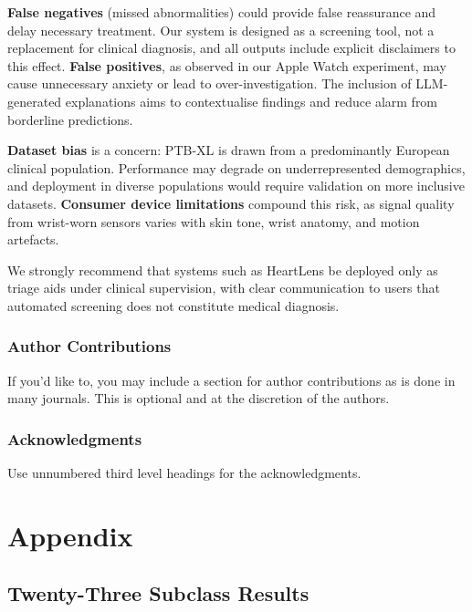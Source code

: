 \documentclass[10pt]{article}
\begin{document}
\textbf{False negatives} (missed abnormalities) could provide false reassurance and delay necessary treatment. Our system is designed as a screening tool, not a replacement for clinical diagnosis, and all outputs include explicit disclaimers to this effect. \textbf{False positives}, as observed in our Apple Watch experiment, may cause unnecessary anxiety or lead to over-investigation. The inclusion of LLM-generated explanations aims to contextualise findings and reduce alarm from borderline predictions.

\textbf{Dataset bias} is a concern: PTB-XL is drawn from a predominantly European clinical population. Performance may degrade on underrepresented demographics, and deployment in diverse populations would require validation on more inclusive datasets. \textbf{Consumer device limitations} compound this risk, as signal quality from wrist-worn sensors varies with skin tone, wrist anatomy, and motion artefacts.

We strongly recommend that systems such as HeartLens be deployed only as triage aids under clinical supervision, with clear communication to users that automated screening does not constitute medical diagnosis.

\subsubsection*{Author Contributions}
If you'd like to, you may include a section for author contributions as is done
in many journals. This is optional and at the discretion of the authors.

\subsubsection*{Acknowledgments}
Use unnumbered third level headings for the acknowledgments.

\newpage



\newpage
\appendix
\section{Appendix}

\subsection{Twenty-Three Subclass Results}
\end{document}
